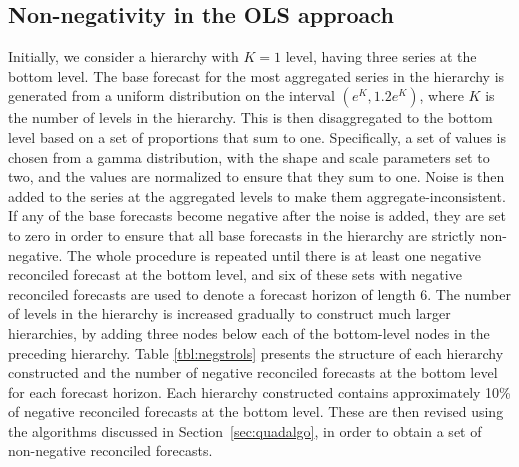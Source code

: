 \documentclass[11pt]{article}
\newcommand{\0}{\phantom{0}}
\begin{document}
\subsection{Non-negativity in the OLS approach}
\label{sec:nonnegols}

Initially, we consider a hierarchy with $K=1$ level, having three series at the bottom level. The base forecast for the most aggregated series in the hierarchy is generated from a uniform distribution on the interval $(e^{K}, 1.2e^{K})$, where $K$ is the number of levels in the hierarchy. This is then disaggregated to the bottom level based on a set of proportions that sum to one. Specifically, a set of values is chosen from a gamma distribution, with the shape and scale parameters set to two, and the values are normalized to ensure that they sum to one. Noise is then added to the series at the aggregated levels to make them aggregate-inconsistent. If any of the base forecasts become negative after the noise is added, they are set to zero in order to ensure that all base forecasts in the hierarchy are strictly non-negative. The whole procedure is repeated until there is at least one negative reconciled forecast at the bottom level, and six of these sets with negative reconciled forecasts are used to denote a forecast horizon of length 6. The number of levels in the hierarchy is increased gradually to construct much larger hierarchies, by adding three nodes below each of the bottom-level nodes in the preceding hierarchy. Table \ref{tbl:negstrols} presents the structure of each hierarchy constructed and the number of negative reconciled forecasts at the bottom level for each forecast horizon. Each hierarchy constructed contains approximately 10\% of negative reconciled forecasts at the bottom level. These are then revised using the algorithms discussed in Section~\ref{sec:quadalgo}, in order to obtain a set of non-negative reconciled forecasts.
\end{document}
